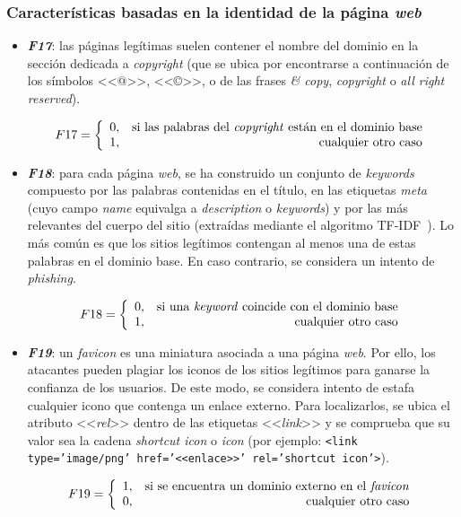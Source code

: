 \subsubsection{Características basadas en la identidad de la página \textit{web}}

\begin{itemize}
	\item \textit{\textbf{F17}}: las páginas legítimas suelen contener el nombre del dominio en la sección dedicada a \textit{copyright} (que se ubica por encontrarse a continuación de los símbolos <<@>>, <<©>>, o de las frases \textit{\& copy}, \textit{copyright} o \textit{all right reserved}).

	\[F17 = \left\{ \begin{array}{lr} 0, & \text{si las palabras del \textit{copyright} están en el dominio base}\\
	1, & \text{\raggedright cualquier otro caso} \label{eqn:phishing_f17} \end{array}\right.\]
	
	\item \textit{\textbf{F18}}: para cada página \textit{web}, se ha construido un conjunto de \textit{keywords} compuesto por las palabras contenidas en el título, en las etiquetas \textit{meta} (cuyo campo \textit{name} equivalga a \textit{description} o \textit{keywords}) y por las más relevantes del cuerpo del sitio (extraídas mediante el algoritmo TF-IDF~\cite{cantinatfidf}). Lo más común es que los sitios legítimos contengan al menos una de estas palabras en el dominio base. En caso contrario, se considera un intento de \textit{phishing}.
	
	\[F18 = \left\{ \begin{array}{lr} 0, & \text{si una \textit{keyword} coincide con el dominio base}\\
	1, & \text{\raggedright cualquier otro caso} \label{eqn:phishing_f18} \end{array}\right.\]
	
	\item \textit{\textbf{F19}}: un \textit{favicon} es una miniatura asociada a una página \textit{web}. Por ello, los atacantes pueden plagiar los iconos de los sitios legítimos para ganarse la confianza de los usuarios. De este modo, se considera intento de estafa cualquier icono que contenga un enlace externo. Para localizarlos, se ubica el atributo <<\textit{rel}>> dentro de las etiquetas <<\textit{link}>> y se comprueba que su valor sea la cadena \textit{shortcut icon} o \textit{icon}  (por ejemplo: \texttt{<link type='image/png' href='<<enlace>>' rel='shortcut icon'>}).
	
	\[F19 = \left\{ \begin{array}{lr} 1, & \text{si se encuentra un dominio externo en el \textit{favicon}}\\
	0, & \text{\raggedright cualquier otro caso} \label{eqn:phishing_f19} \end{array}\right.\]
\end{itemize}




